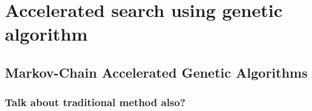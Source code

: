 
\section{Accelerated search using genetic algorithm}


\subsection{Markov-Chain Accelerated Genetic Algorithms}

\subsubsection{Talk about traditional method also?}

